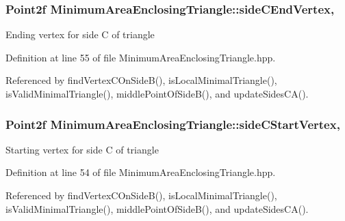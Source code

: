 \hypertarget{classmultiscale_1_1MinimumAreaEnclosingTriangle_a08dbbe5cf66a72a3f973dc0b34526f86}{
\subsubsection[{side\-C\-End\-Vertex}]{\setlength{\rightskip}{0pt plus 5cm}Point2f Minimum\-Area\-Enclosing\-Triangle\-::side\-C\-End\-Vertex\hspace{0.3cm}{\ttfamily [static]}, {\ttfamily [private]}}}\label{classmultiscale_1_1MinimumAreaEnclosingTriangle_a08dbbe5cf66a72a3f973dc0b34526f86}
Ending vertex for side C of triangle 

Definition at line 55 of file Minimum\-Area\-Enclosing\-Triangle.\-hpp.



Referenced by find\-Vertex\-C\-On\-Side\-B(), is\-Local\-Minimal\-Triangle(), is\-Valid\-Minimal\-Triangle(), middle\-Point\-Of\-Side\-B(), and update\-Sides\-C\-A().

\hypertarget{classmultiscale_1_1MinimumAreaEnclosingTriangle_a9c227b89fcf6afe2f6fe0bb842c47518}{
\subsubsection[{side\-C\-Start\-Vertex}]{\setlength{\rightskip}{0pt plus 5cm}Point2f Minimum\-Area\-Enclosing\-Triangle\-::side\-C\-Start\-Vertex\hspace{0.3cm}{\ttfamily [static]}, {\ttfamily [private]}}}\label{classmultiscale_1_1MinimumAreaEnclosingTriangle_a9c227b89fcf6afe2f6fe0bb842c47518}
Starting vertex for side C of triangle 

Definition at line 54 of file Minimum\-Area\-Enclosing\-Triangle.\-hpp.



Referenced by find\-Vertex\-C\-On\-Side\-B(), is\-Local\-Minimal\-Triangle(), is\-Valid\-Minimal\-Triangle(), middle\-Point\-Of\-Side\-B(), and update\-Sides\-C\-A().

